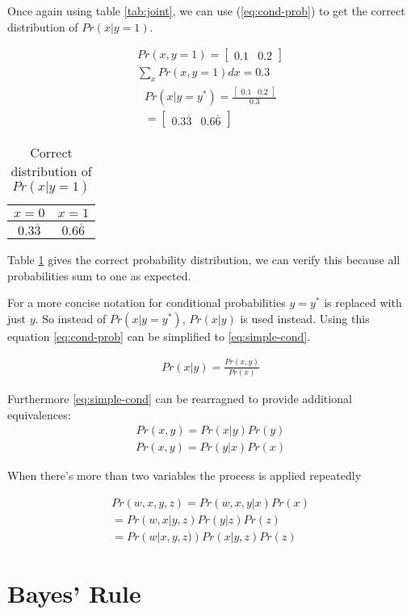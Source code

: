 \documentclass{article}
\begin{document}
Once again using table \ref{tab:joint}, we can use (\ref{eq:cond-prob}) to get the correct distribution of $Pr\left( x|y=1 \right)$.

\begin{align*}
	Pr\left( x,y=1 \right) = \begin{bmatrix} 0.1 & 0.2 \end{bmatrix}   \\
	\sum_{x} Pr(x,y=1)dx = 0.3
\end{align*}
\begin{align*}
	Pr\left( x|y=y^* \right) = \frac{\begin{bmatrix} 0.1 & 0.2 \end{bmatrix} }{0.3} \\
	= \begin{bmatrix} 0.3\overline{3}& 0.6\overline{6} \end{bmatrix}  
\end{align*}

\begin{table}[htpb]
	\centering
	\caption{Correct distribution of $Pr(x|y=1)$}
	\label{tab:correct-cond-x}

	\begin{tabular}{cc}
	$x=0$ & $x=1$ \\
	\hline
	$0.3\overline{3}$ & $0.6\overline{6}$
	\end{tabular}
\end{table}

Table \ref{tab:correct-cond-x} gives the correct probability distribution, we can verify this because all probabilities sum to one as expected.

For a more concise notation for conditional probabilities $y=y^*$ is replaced with just $y$. So instead of $Pr\left( x|y=y^* \right) $, $Pr\left( x|y \right) $ is used instead. Using this equation \ref{eq:cond-prob} can be simplified to \ref{eq:simple-cond}. 

\begin{align} \label{eq:simple-cond}
	Pr\left( x|y \right) =\frac{Pr\left( x,y \right) }{Pr\left( x \right) }
\end{align}

Furthermore \ref{eq:simple-cond} can be rearragned to provide additional equivalences:
\begin{align}
	Pr\left( x,y \right) = Pr\left( x|y \right) Pr(y)
\end{align}
\begin{align}
	Pr(x,y)=Pr\left( y|x \right) Pr(x)
\end{align}

When there's more than two variables the process is applied repeatedly

\begin{align*}
	Pr\left( w,x,y,z \right) = Pr\left( w,x,y|x \right) Pr\left( x \right) \\
	= Pr\left( w,x|y,z \right) Pr(y|z) Pr(z) \\
	= Pr\left( w|x,y,z) \right) Pr(x|y,z) Pr\left( z \right) 
\end{align*}

\section{Bayes' Rule}
\end{document}
